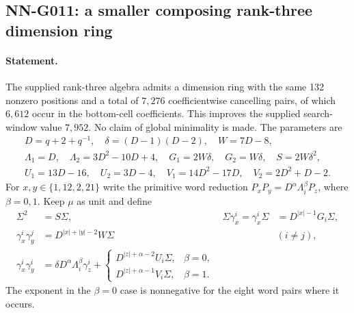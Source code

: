 \subsection{NN-G011: a smaller composing rank-three dimension ring}
\paragraph{Statement.}
The supplied rank-three algebra admits a dimension ring with
the same 132 nonzero positions and a total of $7,276$
coefficientwise cancelling pairs, of which $6,612$ occur in
the bottom-cell coefficients. This improves the supplied
search-window value $7,952$. No claim of global minimality is
made. The parameters are
\[
 \begin{gathered}
 D=q+2+q^{-1},\quad\delta=(D-1)(D-2),\quad W=7D-8,\\
 \Lambda_1=D,\quad\Lambda_2=3D^2-10D+4,\quad
 G_1=2W\delta,\quad G_2=W\delta,\quad S=2W\delta^2,\\
 U_1=13D-16,\quad U_2=3D-4,\quad
 V_1=14D^2-17D,\quad V_2=2D^2+D-2.
 \end{gathered}                                             \tag{G011.1}
\]
For $x,y\in\{1,12,2,21\}$ write the primitive word reduction
$P_xP_y=D^\alpha\Lambda_i^\beta P_z$, where $\beta=0,1$.
Keep $\mu$ as unit and define
\[
 \begin{aligned}
 \Sigma^2&=S\Sigma,&
 \Sigma\gamma_x^i=\gamma_x^i\Sigma&=D^{|x|-1}G_i\Sigma,\\
 \gamma_x^i\gamma_y^j&=D^{|x|+|y|-2}W\Sigma&&(i\ne j),\\
 \gamma_x^i\gamma_y^i&=\delta D^\alpha\Lambda_i^\beta\gamma_z^i
       +\begin{cases}
          D^{|z|+\alpha-2}U_i\Sigma,&\beta=0,\\
          D^{|z|+\alpha-1}V_i\Sigma,&\beta=1.
        \end{cases}
 \end{aligned}                                             \tag{G011.2}
\]
The exponent in the $\beta=0$ case is nonnegative for the
eight word pairs where it occurs.

